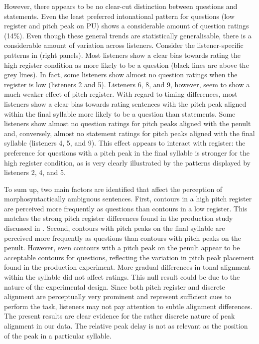 However, there appears to be no clear-cut distinction between questions and statements. Even the least preferred intonational pattern for questions (low register and pitch peak on PU) shows a considerable amount of question ratings (14\%). Even though these general trends are statistically generalisable, there is a considerable amount of variation across listeners. Consider the listener-specific patterns in  (right panels). Most listeners show a clear bias towards rating the high register condition as more likely to be a question (black lines are above the grey lines). In fact, some listeners show almost no question ratings when the register is low (listeners 2 and 5). Listeners 6, 8, and 9, however, seem to show a much weaker effect of pitch register. With regard to timing differences, most listeners show a clear bias towards rating sentences with the pitch peak aligned within the final syllable more likely to be a question than statements. Some listeners show almost no question ratings for pitch peaks aligned with the penult and, conversely, almost no statement ratings for pitch peaks aligned with the final syllable (listeners 4, 5, and 9). This effect appears to interact with register: the preference for questions with a pitch peak in the final syllable is stronger for the high register condition, as is very clearly illustrated by the patterns displayed by listeners 2, 4, and 5.

\largerpage
To sum up, two main factors are identified that affect the perception of morphosyntactically ambiguous sentences. First, contours in a high pitch register are perceived more frequently as questions than contours in a low register. This matches the strong pitch register differences found in the production study discussed in . Second, contours with pitch peaks on the final syllable are perceived more frequently as questions than contours with pitch peaks on the penult. However, even contours with a pitch peak on the penult appear to be acceptable contours for questions, reflecting the variation in pitch peak placement found in the production experiment. More gradual differences in tonal alignment within the syllable did not affect ratings. This null result could be due to the nature of the experimental design. Since both pitch register and discrete alignment are perceptually very prominent and represent sufficient cues to perform the task, listeners may not pay attention to subtle alignment differences. The present results are clear evidence for the rather discrete nature of peak alignment in our data. The relative peak delay is not as relevant as the position of the peak in a particular syllable.


